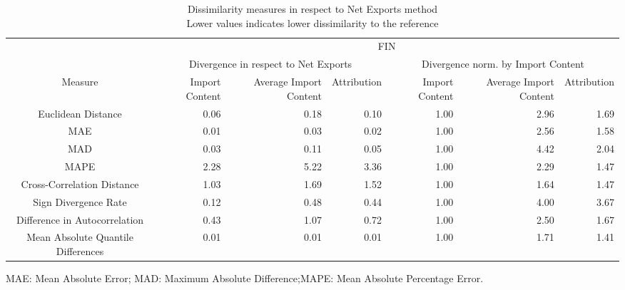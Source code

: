 \begin{table}[t]
\caption*{
{\large Dissimilarity measures in respect to Net Exports method} \\ 
{\small Lower values indicates lower dissimilarity to the reference}
} 
\fontsize{15.0pt}{18.0pt}\selectfont
\begin{tabular*}{\linewidth}{@{\extracolsep{\fill}}crrrrrr}
\toprule
 & \multicolumn{6}{c}{FIN} \\ 
\cmidrule(lr){2-7}
 & \multicolumn{3}{c}{Divergence in respect to Net Exports} & \multicolumn{3}{c}{Divergence norm. by Import Content} \\ 
\cmidrule(lr){2-4} \cmidrule(lr){5-7}
Measure & Import Content & Average Import Content & Attribution & Import Content & Average Import Content & Attribution \\ 
\midrule\addlinespace[2.5pt]
Euclidean Distance & 0.06 & 0.18 & 0.10 & 1.00 & 2.96 & 1.69 \\ 
MAE & 0.01 & 0.03 & 0.02 & 1.00 & 2.56 & 1.58 \\ 
MAD & 0.03 & 0.11 & 0.05 & 1.00 & 4.42 & 2.04 \\ 
MAPE & 2.28 & 5.22 & 3.36 & 1.00 & 2.29 & 1.47 \\ 
Cross-Correlation Distance & 1.03 & 1.69 & 1.52 & 1.00 & 1.64 & 1.47 \\ 
Sign Divergence Rate & 0.12 & 0.48 & 0.44 & 1.00 & 4.00 & 3.67 \\ 
Difference in Autocorrelation & 0.43 & 1.07 & 0.72 & 1.00 & 2.50 & 1.67 \\ 
Mean Absolute Quantile Differences & 0.01 & 0.01 & 0.01 & 1.00 & 1.71 & 1.41 \\ 
\bottomrule
\end{tabular*}
\begin{minipage}{\linewidth}
MAE: Mean Absolute Error; MAD: Maximum Absolute Difference;MAPE: Mean Absolute Percentage Error.\\
\end{minipage}
\end{table}

